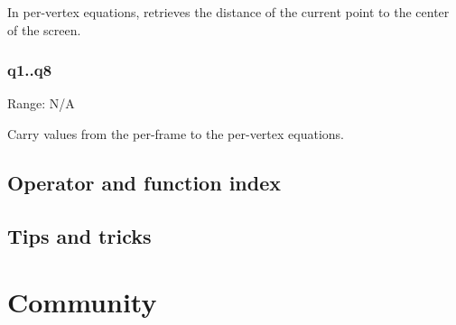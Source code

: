 \documentclass[11pt, a5paper, pagesize]{scrbook}
\begin{document}
In per-vertex equations, retrieves the distance of the current point to the center of the screen.

\subsection{q1..q8}
Range: N/A

Carry values from the per-frame to the per-vertex equations.

\section{Operator and function index}

\section{Tips and tricks}

\chapter{Community}
\end{document}
